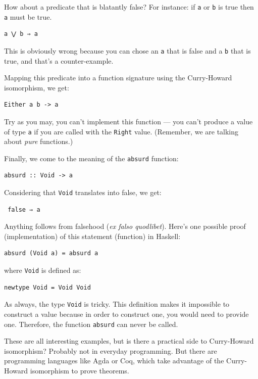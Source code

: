 How about a predicate that is blatantly false? For instance: if
\texttt{a} or \texttt{b} is true then \texttt{a} must be true.

\begin{verbatim}
a ⋁ b ⇒ a
\end{verbatim}

This is obviously wrong because you can chose an \texttt{a} that is
false and a \texttt{b} that is true, and that's a counter-example.

Mapping this predicate into a function signature using the Curry-Howard
isomorphism, we get:

\begin{verbatim}
Either a b -> a
\end{verbatim}

Try as you may, you can't implement this function --- you can't produce
a value of type \texttt{a} if you are called with the \texttt{Right}
value. (Remember, we are talking about \emph{pure} functions.)

Finally, we come to the meaning of the \texttt{absurd} function:

\begin{verbatim}
absurd :: Void -> a
\end{verbatim}

Considering that \texttt{Void} translates into false, we get:

\begin{verbatim}
 false ⇒ a
\end{verbatim}

Anything follows from falsehood (\emph{ex falso quodlibet}). Here's one
possible proof (implementation) of this statement (function) in Haskell:

\begin{verbatim}
absurd (Void a) = absurd a
\end{verbatim}

where \texttt{Void} is defined as:

\begin{verbatim}
newtype Void = Void Void
\end{verbatim}

As always, the type \texttt{Void} is tricky. This definition makes it
impossible to construct a value because in order to construct one, you
would need to provide one. Therefore, the function \texttt{absurd} can
never be called.

These are all interesting examples, but is there a practical side to
Curry-Howard isomorphism? Probably not in everyday programming. But
there are programming languages like Agda or Coq, which take advantage
of the Curry-Howard isomorphism to prove theorems.

